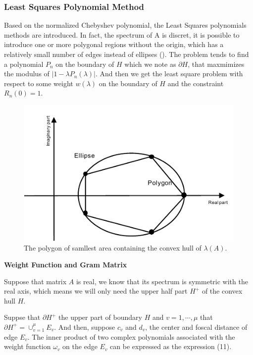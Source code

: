 {\subsubsection{Least Squares Polynomial Method}

Based on the normalized Chebyshev polynomial, the Least Squares polynomials methods are introduced. In fact, the spectrum of A is discret, it is possible to introduce one or more polygonal regions without the origin, which has a relatively small number of edges instead of ellipses (\cite{smolarski1982optimum}). The problem tends to find a polynomial \(P_n\) on the boundary of \(H\) which we note as \(\partial H\), that maxmimizes the modulus of \(|1-\lambda P_n(\lambda)|\). And then we get the least square problem with respect to some weight \(w(\lambda)\) on the boundary of \(H\) and the constraint \(R_n(0)=1\).

\begin{figure}[htbp]
	\centering
	\includegraphics[width=5.4in]{fig/polygon.pdf}
	\caption{The polygon of samllest area containing the convex hull of $\lambda(A)$.}
	\label{polygon}
\end{figure}


\textbf{Weight Function and Gram Matrix}


Suppose that matrix \(A\) is real, we know that its spectrum is symmetric with the real axis, which means we will only need the upper half part \(H^+\) of the convex hull \(H\).

Suppse that \(\partial H^+\) the upper part of boundary \(H\) and \(v=1,\cdots,\mu\) that \(\partial H^+=\cup_{v=1}^\mu E_v\). And then, suppose \(c_v\) and \(d_v\), the center and foscal distance of edge \(E_v\). The inner product of two complex polynomials associated with the weight function \(\omega_v\) on the edge \(E_v\) can be expressed as the expression (11).

}
